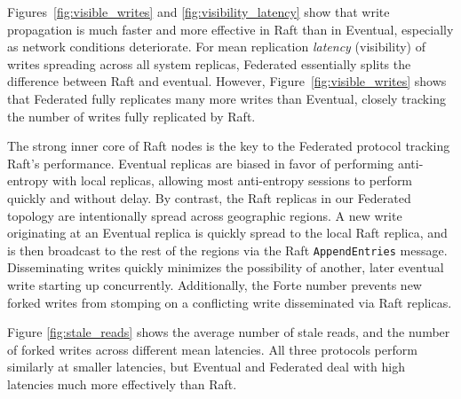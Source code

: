 \documentclass[10pt,conference,letterpaper]{IEEEtran}
\newcommand{\todo}[1]{{\textcolor{red}{#1}}}
\newcommand{\pjk}[1]{[\todo{PJK: #1}]}
\begin{document}

Figures~\ref{fig:visible_writes} and \ref{fig:visibility_latency} show that
write propagation is much faster and more effective in Raft than in Eventual,
especially as network conditions deteriorate.
For mean replication \emph{latency} (visibility) of writes spreading across
all system replicas, Federated essentially splits the difference between Raft
and eventual.
However, Figure~\ref{fig:visible_writes} shows that Federated fully replicates
many more writes than Eventual, closely tracking the number of writes fully
replicated by Raft.

The strong inner core of Raft nodes is the key to the Federated protocol
tracking Raft's performance.
Eventual replicas are biased in favor of performing anti-entropy with local
replicas, allowing most anti-entropy sessions to perform quickly and without
delay.
By contrast, the Raft replicas in our Federated topology are intentionally
spread across geographic regions.
A new write originating at an Eventual replica is quickly spread to the local
Raft replica, and is then broadcast to the rest of the regions via the Raft
\texttt{AppendEntries} message.
Disseminating writes quickly minimizes the possibility of another, later
eventual write starting up concurrently.
Additionally, the Forte number prevents new forked writes from stomping on a
conflicting write disseminated via Raft replicas.

Figure \ref{fig:stale_reads} shows the average number of stale reads, and the
number of forked writes across different mean latencies.
All three protocols perform similarly at smaller latencies, but Eventual and
Federated deal with high latencies much more effectively than Raft.
\end{document}
